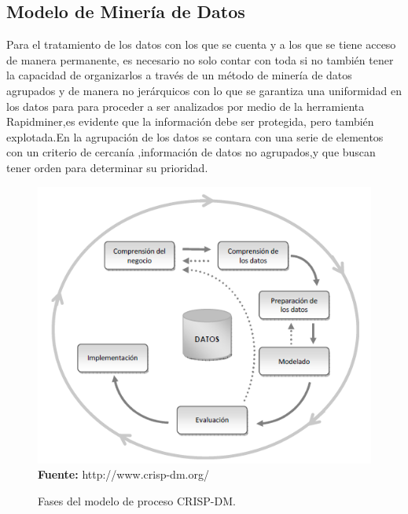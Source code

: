 \documentclass[a4paper,openright,12pt]{book}
\theoremstyle{definition}
\theoremstyle{remark}
\begin{document}
\subsection{Modelo de Minería de Datos}

Para el tratamiento de los datos con los que se cuenta y a los que se tiene acceso de manera permanente, es necesario no solo contar con toda si no también tener la capacidad de organizarlos a través de un método de minería de datos agrupados y de manera no jerárquicos con lo que se garantiza una uniformidad en los datos para para proceder a ser analizados por medio de la herramienta Rapidminer,es evidente que la información debe ser protegida, pero también explotada.En la agrupación de los datos se contara con una serie de elementos  con un criterio de cercanía ,información de datos no agrupados,y que buscan tener orden  para determinar su prioridad.

\begin{figure}[htb]
\centering
\caption{Fases del modelo de proceso CRISP-DM.} 
\includegraphics[scale=0.50]{CRIPS}
\\\textbf{Fuente:} http://www.crisp-dm.org/
\label{fig:Ubicacion}
\end{figure}
\end{document}

